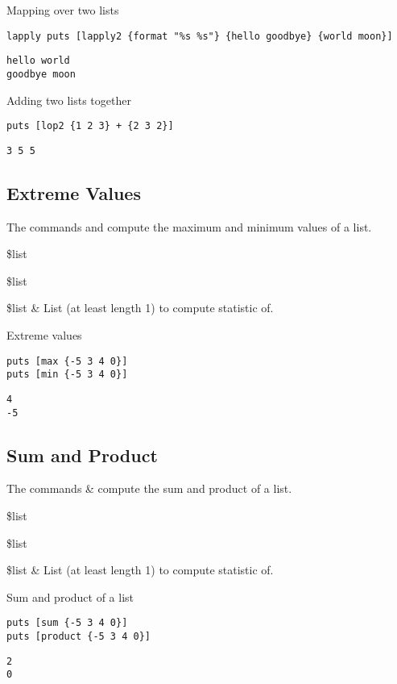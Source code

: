 \documentclass{article}
\begin{document}
\begin{example}{Mapping over two lists}
\begin{lstlisting}
lapply puts [lapply2 {format "%s %s"} {hello goodbye} {world moon}]
\end{lstlisting}
\tcblower
\begin{lstlisting}
hello world
goodbye moon
\end{lstlisting}
\end{example}

\begin{example}{Adding two lists together}
\begin{lstlisting}
puts [lop2 {1 2 3} + {2 3 2}]
\end{lstlisting}
\tcblower
\begin{lstlisting}
3 5 5
\end{lstlisting}
\end{example}

\clearpage
\subsection{Extreme Values}
The commands  and  compute the maximum and minimum values of a list.
\begin{syntax}
 \$list 
\end{syntax}
\begin{syntax}
 \$list 
\end{syntax}
\begin{args}
\$list & List (at least length 1) to compute statistic of. 
\end{args}
\begin{example}{Extreme values}
\begin{lstlisting}
puts [max {-5 3 4 0}]
puts [min {-5 3 4 0}]
\end{lstlisting}
\tcblower
\begin{lstlisting}
4
-5
\end{lstlisting}
\end{example}
\subsection{Sum and Product}
The commands  \&  compute the sum and product of a list.
\begin{syntax}
 \$list
\end{syntax}
\begin{syntax}
 \$list
\end{syntax}
\begin{args}
\$list & List (at least length 1) to compute statistic of. 
\end{args}
\begin{example}{Sum and product of a list}
\begin{lstlisting}
puts [sum {-5 3 4 0}]
puts [product {-5 3 4 0}]
\end{lstlisting}
\tcblower
\begin{lstlisting}
2
0
\end{lstlisting}
\end{example}
\clearpage
\end{document}
